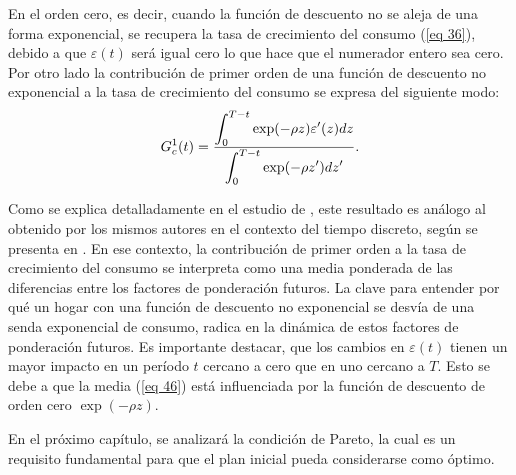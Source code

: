 En el orden cero, es decir, cuando la función de descuento no se aleja de una forma exponencial, se recupera la tasa de crecimiento del consumo (\ref{eq 36}), debido a que $\varepsilon(t)$ será igual cero lo que hace que el numerador entero sea cero. Por otro lado la contribución de primer orden de una función de descuento no exponencial a la tasa de crecimiento del consumo se expresa del siguiente modo:
\begin{equation}
\label{eq 46}
    G^1_c(t)= \dfrac{\displaystyle \int_0^{T-t} \exp(- \rho z ) \varepsilon' (z) dz}{\displaystyle \int_0^{T-t} \exp(- \rho z' )  dz'}.
\end{equation}

Como se explica detalladamente en el estudio de \parencite{feigenbaum2021deviation}, este resultado es análogo al obtenido por los mismos autores en el contexto del tiempo discreto, según se presenta en \parencite{Feigenbaum21}. En ese contexto, la contribución de primer orden a la tasa de crecimiento del consumo se interpreta como una media ponderada de las diferencias entre los factores de ponderación futuros. La clave para entender por qué un hogar con una función de descuento no exponencial se desvía de una senda exponencial de consumo, radica en la dinámica de estos factores de ponderación futuros. 
Es importante destacar, que los cambios en $\varepsilon(t)$ tienen un mayor impacto en un período $t$ cercano a cero que en uno cercano a $T$. Esto se debe a que la media (\ref{eq 46}) está influenciada por la función de descuento de orden cero $\exp(-\rho z)$.

En el próximo capítulo, se analizará la condición de Pareto, la cual es un requisito fundamental para que el plan inicial pueda considerarse como óptimo.